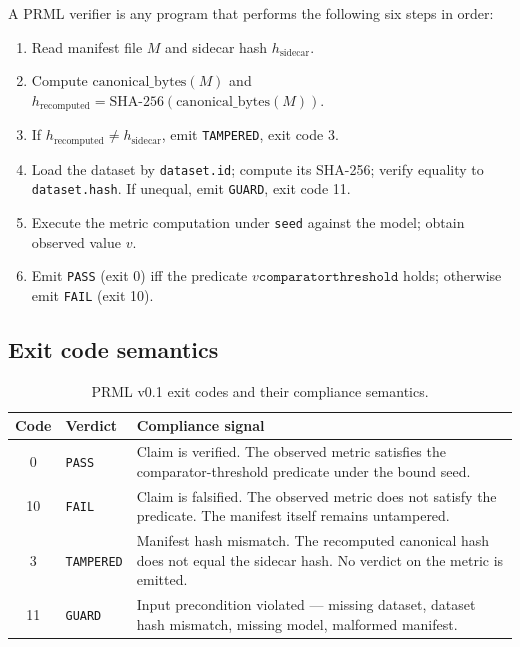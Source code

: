 \documentclass[11pt, a4paper]{article}
\begin{document}
A PRML verifier is any program that performs the following six steps in order:

\begin{enumerate}[leftmargin=2em, itemsep=0.2em]
  \item Read manifest file $M$ and sidecar hash $h_{\text{sidecar}}$.
  \item Compute $\mathrm{canonical\_bytes}(M)$ and $h_{\text{recomputed}} = \mathrm{SHA\text{-}256}(\mathrm{canonical\_bytes}(M))$.
  \item If $h_{\text{recomputed}} \neq h_{\text{sidecar}}$, emit \texttt{TAMPERED}, exit code 3.
  \item Load the dataset by \texttt{dataset.id}; compute its SHA-256; verify equality to \texttt{dataset.hash}. If unequal, emit \texttt{GUARD}, exit code 11.
  \item Execute the metric computation under \texttt{seed} against the model; obtain observed value $v$.
  \item Emit \texttt{PASS} (exit 0) iff the predicate $v \mathbin{\texttt{comparator}} \texttt{threshold}$ holds; otherwise emit \texttt{FAIL} (exit 10).
\end{enumerate}

\subsection{Exit code semantics}

\begin{table}[h]
\centering
\small
\begin{tabular}{@{}c l p{8cm}@{}}
\toprule
Code & Verdict & Compliance signal \\
\midrule
0 & \texttt{PASS} & Claim is verified. The observed metric satisfies the comparator-threshold predicate under the bound seed. \\
10 & \texttt{FAIL} & Claim is falsified. The observed metric does not satisfy the predicate. The manifest itself remains untampered. \\
3 & \texttt{TAMPERED} & Manifest hash mismatch. The recomputed canonical hash does not equal the sidecar hash. No verdict on the metric is emitted. \\
11 & \texttt{GUARD} & Input precondition violated --- missing dataset, dataset hash mismatch, missing model, malformed manifest. \\
\bottomrule
\end{tabular}
\caption{PRML v0.1 exit codes and their compliance semantics.}
\label{tab:exit-codes}
\end{table}
\end{document}
